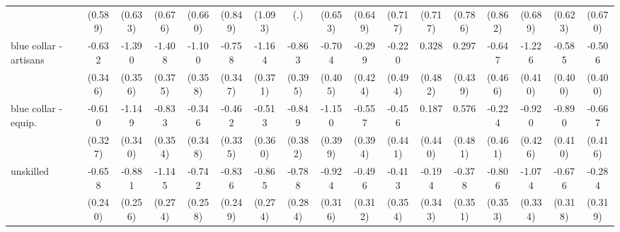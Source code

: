 {\begin{tabular}{l*{16}{c}}
                    &     (0.589)         &     (0.633)         &     (0.676)         &     (0.660)         &     (0.849)         &     (1.093)         &         (.)         &     (0.653)         &     (0.649)         &     (0.717)         &     (0.717)         &     (0.786)         &     (0.862)         &     (0.689)         &     (0.623)         &     (0.670)         \\
[1em]
blue collar - artisans&      -0.632         &      -1.390\sym{***}&      -1.408\sym{***}&      -1.100\sym{**} &      -0.758\sym{*}  &      -1.164\sym{**} &      -0.863\sym{*}  &      -0.704         &      -0.299         &      -0.220         &       0.328         &       0.297         &      -0.647         &      -1.226\sym{**} &      -0.585         &      -0.506         \\
                    &     (0.346)         &     (0.356)         &     (0.375)         &     (0.358)         &     (0.347)         &     (0.371)         &     (0.395)         &     (0.405)         &     (0.424)         &     (0.494)         &     (0.482)         &     (0.439)         &     (0.466)         &     (0.410)         &     (0.400)         &     (0.400)         \\
[1em]
blue collar - equip.&      -0.610         &      -1.149\sym{***}&      -0.833\sym{*}  &      -0.346         &      -0.462         &      -0.513         &      -0.849\sym{*}  &      -1.150\sym{**} &      -0.557         &      -0.456         &       0.187         &       0.576         &      -0.224         &      -0.920\sym{*}  &      -0.890\sym{*}  &      -0.667         \\
                    &     (0.327)         &     (0.340)         &     (0.354)         &     (0.348)         &     (0.335)         &     (0.360)         &     (0.382)         &     (0.399)         &     (0.394)         &     (0.441)         &     (0.440)         &     (0.481)         &     (0.461)         &     (0.426)         &     (0.410)         &     (0.416)         \\
[1em]
unskilled           &      -0.658\sym{**} &      -0.881\sym{***}&      -1.145\sym{***}&      -0.742\sym{**} &      -0.836\sym{***}&      -0.865\sym{**} &      -0.788\sym{**} &      -0.924\sym{**} &      -0.496         &      -0.413         &      -0.194         &      -0.378         &      -0.806\sym{*}  &      -1.074\sym{**} &      -0.676\sym{*}  &      -0.284         \\
                    &     (0.240)         &     (0.256)         &     (0.274)         &     (0.258)         &     (0.249)         &     (0.274)         &     (0.284)         &     (0.316)         &     (0.312)         &     (0.354)         &     (0.343)         &     (0.351)         &     (0.353)         &     (0.334)         &     (0.318)         &     (0.319)         \\

\end{tabular}}
